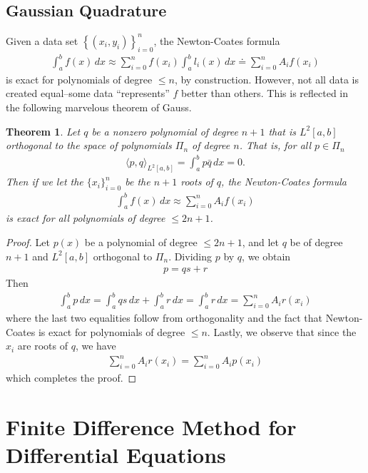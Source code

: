 \documentclass[12pt]{article}
\theoremstyle{plain}
\newtheorem{theorem}{Theorem}
\theoremstyle{definition}
\theoremstyle{remark}
\numberwithin{equation}{section}  %
\begin{document}
\subsection{Gaussian Quadrature}
Given a data set $ \left\{ (x_i, y_i) \right\}_{i = 0}^n $, the
Newton-Coates formula
\begin{align*}
\int_a^b f(x)\, dx \approx \sum_{i=0}^n f(x_i)\int_a^b l_i(x)\, dx 
\doteq \sum_{i=0}^n A_i f(x_i)
\end{align*}
is exact for polynomials of degree $\le n$, by construction. However, not all
data is created equal--some data ``represents'' $f$ better than others.
This is reflected in the following marvelous theorem of Gauss. 
\begin{theorem}
Let $q$ be a nonzero polynomial of degree $n + 1$ that is $L^2[a,b]$ orthogonal
to the space of polynomials $\Pi_n$ of degree $n$. That is, for all $p \in
\Pi_n$
\begin{align*}
\langle p,q \rangle_{L^2[a,b]}  = \int_a^b p \bar{q} \, dx = 0.
\end{align*}
Then if we let the $\{ x_i \}_{i=0}^{n}$ be the $n+1$ roots of $q$, the 
Newton-Coates formula
\begin{align*}
\int_a^b f(x) \, dx \approx \sum_{i=0}^n A_i f(x_i)
\end{align*}
is exact for all polynomials of degree $\le 2n + 1$.
\end{theorem}
\begin{proof}
Let $p(x)$ be a polynomial of degree $\le 2n+1$, and let $q$ be of degree
$n+1$ and $L^2[a,b]$ orthogonal to $\Pi_n$. Dividing $p$ by $q$, we obtain
\begin{align*}
p = qs + r  
\end{align*}
Then 
\begin{align*}
\int_a^b p \, dx = \int_a^b qs \, dx + \int_a^b
r \, dx = \int_a^b r \, dx = \sum_{i=0}^n A_i r(x_i) 
\end{align*}
where the last two equalities follow from orthogonality and the fact
that Newton-Coates is exact for polynomials of degree $\le n$. Lastly,
we observe that since the $x_i$ are roots of $q$, we have
\begin{align*}
\sum_{i = 0}^n A_i r(x_i) = \sum_{i=0}^n A_i p(x_i)
\end{align*}
which completes the proof. 
\end{proof}
\section{Finite Difference Method for Differential Equations}
\end{document}
